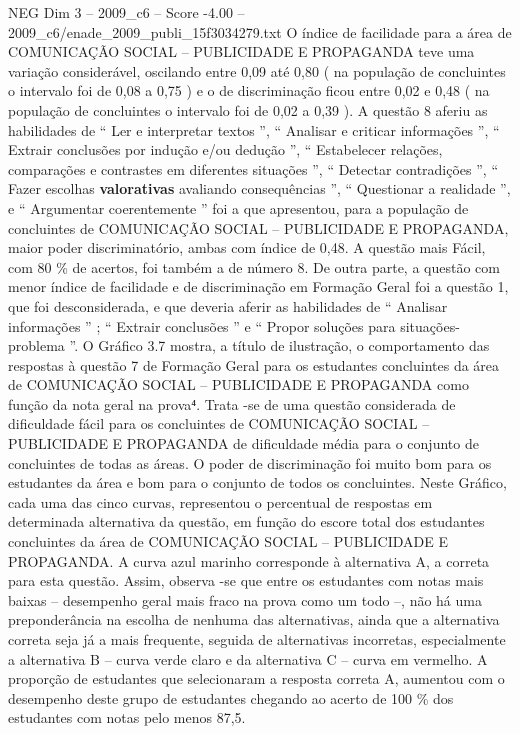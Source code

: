 \begin{textsample}{NEG Dim 3 – 2009\_c6 – Score -4.00 – 2009\_c6/enade\_2009\_publi\_15f3034279.txt}
O índice de facilidade para a área de COMUNICAÇÃO SOCIAL – PUBLICIDADE E PROPAGANDA teve uma variação considerável, oscilando entre 0,09 até 0,80 ( na população de concluintes o intervalo foi de 0,08 a 0,75 ) e o de discriminação ficou entre 0,02 e 0,48 ( na população de concluintes o intervalo foi de 0,02 a 0,39 ).
A questão 8 aferiu as habilidades de “ Ler e interpretar textos ”, “ Analisar e criticar informações ”, “ Extrair conclusões por indução e/ou dedução ”, “ Estabelecer relações, comparações e contrastes em diferentes situações ”, “ Detectar contradições ”, “ Fazer escolhas \textbf{valorativas} avaliando consequências ”, “ Questionar a realidade ”, e “ Argumentar coerentemente ” foi a que apresentou, para a população de concluintes de COMUNICAÇÃO SOCIAL – PUBLICIDADE E PROPAGANDA, maior poder discriminatório, ambas com índice de 0,48.
A questão mais Fácil, com 80 \% de acertos, foi também a de número 8.
De outra parte, a questão com menor índice de facilidade e de discriminação em Formação Geral foi a questão 1, que foi desconsiderada, e que deveria aferir as habilidades de “ Analisar informações ” ; “ Extrair conclusões ” e “ Propor soluções para situações-problema ”.
O Gráfico 3.7 mostra, a título de ilustração, o comportamento das respostas à questão 7 de Formação Geral para os estudantes concluintes da área de COMUNICAÇÃO SOCIAL – PUBLICIDADE E PROPAGANDA como função da nota geral na prova⁴.
Trata -se de uma questão considerada de dificuldade fácil para os concluintes de COMUNICAÇÃO SOCIAL – PUBLICIDADE E PROPAGANDA de dificuldade média para o conjunto de concluintes de todas as áreas.
O poder de discriminação foi muito bom para os estudantes da área e bom para o conjunto de todos os concluintes.
Neste Gráfico, cada uma das cinco curvas, representou o percentual de respostas em determinada alternativa da questão, em função do escore total dos estudantes concluintes da área de COMUNICAÇÃO SOCIAL – PUBLICIDADE E PROPAGANDA.
A curva azul marinho corresponde à alternativa A, a correta para esta questão.
Assim, observa -se que entre os estudantes com notas mais baixas – desempenho geral mais fraco na prova como um todo –, não há uma preponderância na escolha de nenhuma das alternativas, ainda que a alternativa correta seja já a mais frequente, seguida de alternativas incorretas, especialmente a alternativa B – curva verde claro e da alternativa C – curva em vermelho.
A proporção de estudantes que selecionaram a resposta correta A, aumentou com o desempenho deste grupo de estudantes chegando ao acerto de 100 \% dos estudantes com notas pelo menos 87,5.

\end{textsample}
